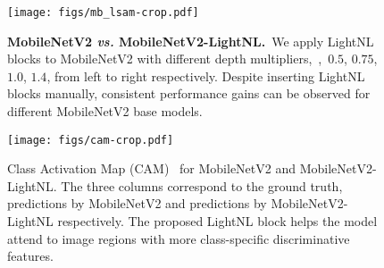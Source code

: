 \documentclass[10pt,twocolumn,letterpaper]{article}
\begin{document}
\begin{figure}[tb]
\centering
\texttt{[image: figs/mb\_lsam-crop.pdf]}
\caption{\textbf{MobileNetV2 \emph{vs.} MobileNetV2-LightNL.}~We apply LightNL blocks to MobileNetV2 with different depth multipliers,~\ie,~$0.5$, $0.75$, $1.0$, $1.4$, from left to right respectively. Despite inserting LightNL blocks manually, consistent performance gains can be observed for different MobileNetV2 base models.}
\label{fig:mbv2}
\vspace{-1em}
\end{figure}

\begin{figure*}[tb]
\centering
\texttt{[image: figs/cam-crop.pdf]}
\caption{Class Activation Map (CAM)~\cite{zhou2016learning} for MobileNetV2 and MobileNetV2-LightNL. The three columns correspond to the ground truth,  predictions by MobileNetV2 and predictions by MobileNetV2-LightNL respectively. The proposed LightNL block helps the model attend to image regions with more class-specific discriminative features.}
\label{fig:cam}
\vspace{-1em}
\end{figure*}
\end{document}
